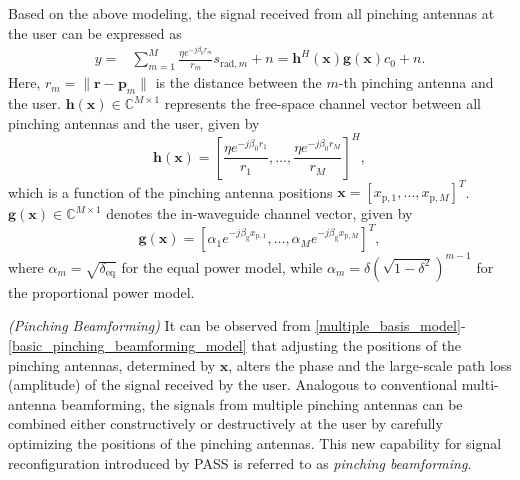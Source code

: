 Based on the above modeling, the signal received from all pinching antennas at the user can be expressed as 
\begin{align} \label{multiple_basis_model}
    y = &\sum_{m=1}^M \frac{\eta e^{-j \beta_0 r_m}}{r_m} s_{\mathrm{rad}, m} + n = \mathbf{h}^H(\mathbf{x}) \mathbf{g}(\mathbf{x}) c_0 + n.
\end{align}
Here, $r_m = \|\mathbf{r} - \mathbf{p}_m\|$ is the distance between the $m$-th pinching antenna and the user. $\mathbf{h}(\mathbf{x}) \in \mathbb{C}^{M \times 1}$ represents the free-space channel vector between all pinching antennas and the user, given by 
\begin{equation} \label{basic_channel_model}
    \mathbf{h}(\mathbf{x}) = \left[\frac{\eta e^{-j \beta_0 r_1}}{r_1},\dots,\frac{\eta e^{-j \beta_0 r_M}}{r_M}  \right]^H,
\end{equation}
which is a function of the pinching antenna positions $\mathbf{x} = [x_{\mathrm{p},1},\dots,x_{\mathrm{p},M}]^T$. $\mathbf{g}(\mathbf{x}) \in \mathbb{C}^{M \times 1}$ denotes the in-waveguide channel vector, given by 
\begin{equation} \label{basic_pinching_beamforming_model}
    \mathbf{g}(\mathbf{x}) = \left[ \alpha_1 e^{-j \beta_{\mathrm{g}} x_{\mathrm{p},1}},\dots,\alpha_M e^{-j \beta_{\mathrm{g}} x_{\mathrm{p},M}} \right]^T,
\end{equation} 
where $\alpha_m = \sqrt{\delta_{\mathrm{eq}}}$ for the equal power model, while $\alpha_m = \delta(\sqrt{1 - \delta^2})^{m-1}$ for the proportional power model.  

\begin{remark}
    \normalfont
    \emph{(Pinching Beamforming)} It can be observed from
    \eqref{multiple_basis_model}-\eqref{basic_pinching_beamforming_model} that adjusting the positions of  the pinching antennas, determined by $\mathbf{x}$, alters the phase and the large-scale path loss (amplitude) of the signal received by the user. Analogous to conventional multi-antenna beamforming, the signals from multiple pinching antennas can be combined either constructively or destructively at the user by carefully optimizing the positions of the pinching antennas. This new capability for signal reconfiguration introduced by PASS is referred to as \emph{pinching beamforming}.
    
\end{remark}




